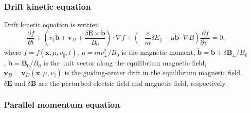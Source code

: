 \documentclass{article}
\begin{document}
\

\

\subsubsection{Drift kinetic equation}

Drift kinetic equation is written
\begin{equation}
  \frac{\partial f}{\partial t} + \left( v_{\parallel} \tilde{\mathbf{b}}
  +\mathbf{v}_D + \frac{\delta \mathbf{E} \times \mathbf{b}}{B_0} \right)
  \cdot \nabla f + \left( - \frac{e}{m} \delta E_{\parallel} - \mu
  \tilde{\mathbf{b}} \cdot \nabla B \right) \frac{\partial f}{\partial
  v_{\parallel}} = 0,
\end{equation}
where $f = f (\mathbf{x}, \mu, v_{\parallel}, t)$, $\mu = m v_{\perp}^2 / B_0$
is the magnetic moment, $\tilde{\mathbf{b}} =\mathbf{b}+ \delta
\mathbf{B}_{\perp} / B_0$, $\mathbf{b}=\mathbf{B}_0 / B_0$ is the unit vector
along the equilibrium magnetic field, $\mathbf{v}_D =\mathbf{v}_D (\mathbf{x},
\mu, v_{\parallel})$ is the guiding-center drift in the equilibrium magnetic
field. $\delta \mathbf{E}$ and $\delta \mathbf{B}$ are the perturbed electric
field and magnetic field, respectively.

\subsubsection{Parallel momentum equation}
\end{document}
